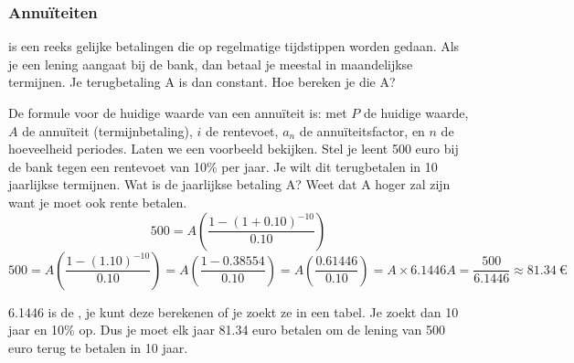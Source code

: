\documentclass[a4paper,11pt]{article}
\begin{document}
    \subsubsection{Annuïteiten}
     is een reeks gelijke betalingen die op regelmatige tijdstippen worden gedaan. 
    Als je een lening aangaat bij de bank, dan betaal je meestal in maandelijkse termijnen.
    Je terugbetaling A is dan constant. Hoe bereken je die A?
    \newline

    De formule voor de huidige waarde van een annuïteit is:
    {met $P$ de huidige waarde, $A$ de annuïteit (termijnbetaling), $i$ de rentevoet, $a_n$ de annuïteitsfactor, en $n$ de hoeveelheid periodes.}
    Laten we een voorbeeld bekijken.
    Stel je leent 500 euro bij de bank tegen een rentevoet van 10\% per jaar.
    Je wilt dit terugbetalen in 10 jaarlijkse termijnen. Wat is de jaarlijkse betaling A?
    Weet dat A hoger zal zijn want je moet ook rente betalen.
    \[
    500 = A \left( \frac{1 - (1 + 0.10)^{-10}}{0.10} \right)
    \]
    \[
    500 = A \left( \frac{1 - (1.10)^{-10}}{0.10} \right) = 
    A \left( \frac{1 - 0.38554}{0.10} \right) = A \left( \frac{0.61446}{0.10} \right) = A \times 6.1446
    A = \frac{500}{6.1446} \approx 81.34~\text{€}
    \]

    6.1446 is de , je kunt deze berekenen of je zoekt ze in een tabel. Je zoekt dan 10 jaar en 10\% op.
    Dus je moet elk jaar 81.34 euro betalen om de lening van 500 euro terug te betalen in 10 jaar.
    \newline
\end{document}
